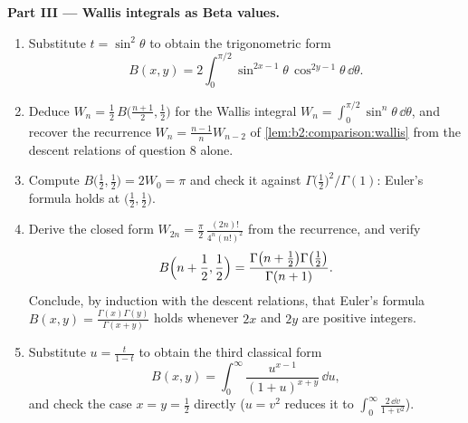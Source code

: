 \begin{problem}
\medskip
\noindent\textbf{Part III --- Wallis integrals as Beta values.}
\begin{enumerate}[resume]
  \item Substitute $t = \sin^2\theta$ to obtain the trigonometric
        form
        \[
        B(x, y) = 2\int_0^{\pi/2}
        \sin^{2x-1}\theta\,\cos^{2y-1}\theta\,\dd\theta .
        \]
  \item Deduce $W_n = \frac12\,B\bigl(\frac{n+1}2, \frac12\bigr)$
        for the Wallis integral $W_n = \int_0^{\pi/2}\sin^n
        \theta\,\dd\theta$, and recover the recurrence $W_n =
        \frac{n-1}{n}W_{n-2}$ of \cref{lem:b2:comparison:wallis}
        from the descent relations of question 8 alone.
  \item Compute $B\bigl(\frac12, \frac12\bigr) = 2W_0 = \pi$ and
        check it against $\Gamma\bigl(\frac12\bigr)^2/\Gamma(1)$:
        Euler's formula holds at $\bigl(\frac12,
        \frac12\bigr)$.
  \item Derive the closed form $W_{2n} = \frac\pi2\,
        \frac{(2n)!}{4^n(n!)^2}$ from the recurrence, and verify
        \[
        B\Bigl(n + \frac12, \frac12\Bigr)
        = \frac{\Gamma\bigl(n + \frac12\bigr)\Gamma\bigl(
        \frac12\bigr)}{\Gamma(n+1)} .
        \]
        Conclude, by induction with the descent relations, that
        Euler's formula $B(x,y) =
        \frac{\Gamma(x)\Gamma(y)}{\Gamma(x+y)}$ holds whenever
        $2x$ and $2y$ are positive integers.
  \item Substitute $u = \frac{t}{1-t}$ to obtain the third
        classical form
        \[
        B(x,y) = \int_0^\infty
        \frac{u^{x-1}}{(1+u)^{x+y}}\,\dd u ,
        \]
        and check the case $x = y = \frac12$ directly ($u = v^2$
        reduces it to $\int_0^\infty\frac{2\,\dd v}{1+v^2}$).
\end{enumerate}


\end{problem}
